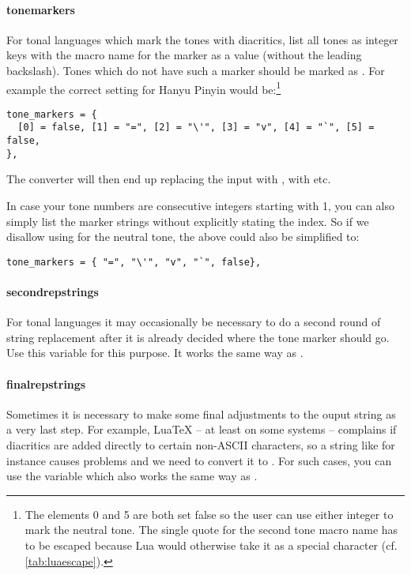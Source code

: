 \documentclass{ltxdockit}
\begin{document}
\paragraph{tone\textunderscore{}markers}

For tonal languages which mark the tones with diacritics, list all tones as
integer keys with the macro name for the marker as a value (without the
leading backslash). Tones which do not have such a marker should be marked as
. For example the correct setting for Hanyu Pinyin would
be:\footnote{The elements 0 and 5 are both set false so the user can use either
  integer to mark the neutral tone. The single quote for the second tone macro
  name has to be escaped because Lua would otherwise take it as a special
character (cf. \autoref{tab:luaescape}).}

\begin{lstlisting}
tone_markers = {
  [0] = false, [1] = "=", [2] = "\'", [3] = "v", [4] = "`", [5] = false,
},
\end{lstlisting}

The converter will then end up replacing the input  with
,  with  etc.

In case your tone numbers are consecutive integers starting with 1, you can also
simply list the marker strings without explicitly stating the index. So if we
disallow using  for the neutral tone, the above could also be simplified
to:

\begin{lstlisting}
tone_markers = { "=", "\'", "v", "`", false},
\end{lstlisting}

\paragraph{second\textunderscore{}rep\textunderscore{}strings}

For tonal languages it may occasionally be necessary to do a second round of
string replacement after it is already decided where the tone marker should go.
Use this variable for this purpose. It works the same way as
.

\paragraph{final\textunderscore{}rep\textunderscore{}strings}

Sometimes it is necessary to make some final adjustments to the ouput string as
a very last step. For example, LuaTeX -- at least on some systems -- complains
if diacritics are added directly to certain non-ASCII characters, so
a string like
 for instance causes problems and we
need to convert
it to . For such
cases, you can use
the variable 
which also works the same way as
.
\end{document}
